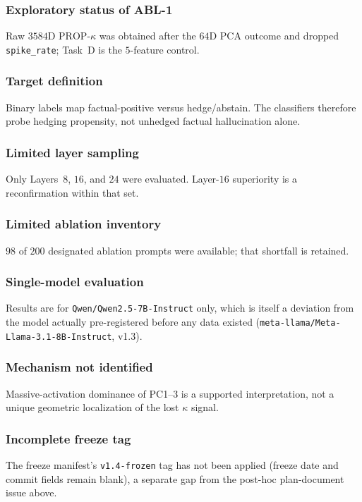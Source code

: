 \documentclass{article}
\newcommand{\propk}{\mathrm{PROP}\text{-}\kappa}
\begin{document}
\subsubsection{Exploratory status of {ABL-1}}
Raw $3584${D} $\propk$ was obtained after the $64${D} {PCA} outcome and dropped \texttt{spike\_rate}; Task~D is the $5$-feature control.

\subsubsection{Target definition}
Binary labels map factual-positive versus hedge/abstain. The classifiers therefore probe hedging propensity, not unhedged factual hallucination alone.

\subsubsection{Limited layer sampling}
Only Layers~$8$, $16$, and $24$ were evaluated. Layer-$16$ superiority is a reconfirmation within that set.

\subsubsection{Limited ablation inventory}
$98$ of $200$ designated ablation prompts were available; that shortfall is retained.

\subsubsection{Single-model evaluation}
Results are for \texttt{Qwen/Qwen2.5-7B-Instruct} only, which is itself a deviation from the model actually pre-registered before any data existed (\texttt{meta-llama/Meta-Llama-3.1-8B-Instruct}, v1.3).

\subsubsection{Mechanism not identified}
Massive-activation dominance of {PC1}--{3} is a supported interpretation, not a unique geometric localization of the lost $\kappa$ signal.

\subsubsection{Incomplete freeze tag}
The freeze manifest's \texttt{v1.4-frozen} tag has not been applied (freeze date and commit fields remain blank), a separate gap from the post-hoc plan-document issue above.
\end{document}
